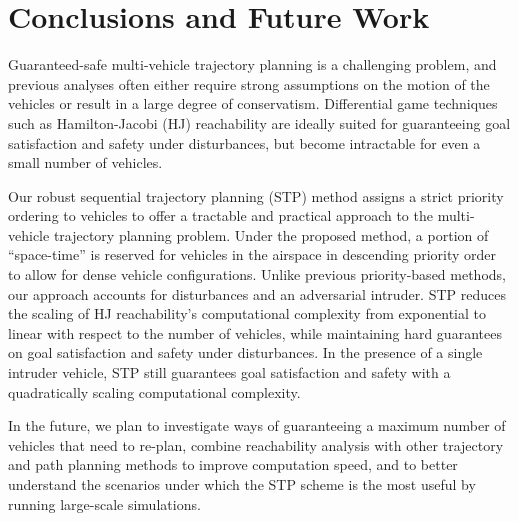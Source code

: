 \section{Conclusions and Future Work}
Guaranteed-safe multi-vehicle trajectory planning is a challenging problem, and previous analyses often either require strong assumptions on the motion of the vehicles or result in a large degree of conservatism. Differential game techniques such as Hamilton-Jacobi (HJ) reachability are ideally suited for guaranteeing goal satisfaction and safety under disturbances, but become intractable for even a small number of vehicles.

Our robust sequential trajectory planning (STP) method assigns a strict priority ordering to vehicles to offer a tractable and practical approach to the multi-vehicle trajectory planning problem. Under the proposed method, a portion of ``space-time'' is reserved for vehicles in the airspace in descending priority order to allow for dense vehicle configurations. Unlike previous priority-based methods, our approach accounts for disturbances and an adversarial intruder. STP reduces the scaling of HJ reachability's computational complexity from exponential to linear with respect to the number of vehicles, while maintaining hard guarantees on goal satisfaction and safety under disturbances. In the presence of a single intruder vehicle, STP still guarantees goal satisfaction and safety with a quadratically scaling computational complexity.

In the future, we plan to investigate ways of guaranteeing a maximum number of vehicles that need to re-plan, combine reachability analysis with other trajectory and path planning methods to improve computation speed, and to better understand the scenarios under which the STP scheme is the most useful by running large-scale simulations.